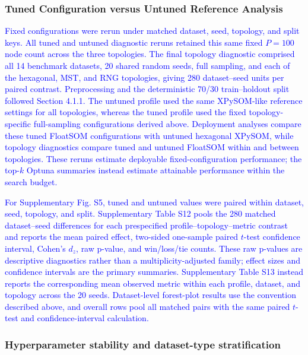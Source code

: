 \documentclass[10pt]{article} %
\newcommand{\TrackedChange}[1]{\textcolor{blue}{#1}}
\begin{document}
\subsubsection{Tuned Configuration versus Untuned Reference Analysis}

\TrackedChange{Fixed configurations were rerun under matched dataset, seed, topology, and split keys.} \TrackedChange{All tuned and untuned diagnostic reruns retained this same fixed $P=100$ node count across the three topologies.} \TrackedChange{The final topology diagnostic comprised all 14 benchmark datasets, 20 shared random seeds, full sampling, and each of the hexagonal, MST, and RNG topologies, giving 280 dataset--seed units per paired contrast.} \TrackedChange{Preprocessing and the deterministic 70/30 train--holdout split followed Section 4.1.1. The untuned profile used the same XPySOM-like reference settings for all topologies, whereas the tuned profile used the fixed topology-specific full-sampling configurations derived above.} \TrackedChange{Deployment analyses compare these tuned FloatSOM configurations with untuned hexagonal XPySOM, while topology diagnostics compare tuned and untuned FloatSOM within and between topologies.} \TrackedChange{These reruns estimate deployable fixed-configuration performance; the top-$k$ Optuna summaries instead estimate attainable performance within the search budget.}

\TrackedChange{For Supplementary Fig. S5, tuned and untuned values were paired within dataset, seed, topology, and split.} \TrackedChange{Supplementary Table S12 pools the 280 matched dataset--seed differences for each prespecified profile--topology--metric contrast and reports the mean paired effect, two-sided one-sample paired $t$-test confidence interval, Cohen's $d_z$, raw p-value, and win/loss/tie counts.} \TrackedChange{These raw p-values are descriptive diagnostics rather than a multiplicity-adjusted family; effect sizes and confidence intervals are the primary summaries.} \TrackedChange{Supplementary Table S13 instead reports the corresponding mean observed metric within each profile, dataset, and topology across the 20 seeds.} \TrackedChange{Dataset-level forest-plot results use the convention described above, and overall rows pool all matched pairs with the same paired $t$-test and confidence-interval calculation.}

\subsubsection{Hyperparameter stability and dataset-type stratification}
\end{document}
